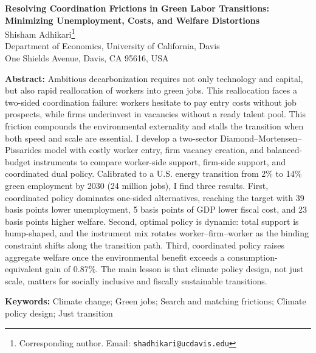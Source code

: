 \documentclass[12pt]{elsarticle}
\begin{document}
\thispagestyle{empty}

\begin{center}
    {\textbf{Resolving Coordination Frictions in Green Labor Transitions:}}\\[0.4em]
    { \textbf{Minimizing Unemployment, Costs, and Welfare Distortions}}\\[2em]

    {\normalsize
    Shisham Adhikari\footnote{Corresponding author. Email: \texttt{shadhikari@ucdavis.edu}}\\[0.5em]
    Department of Economics, University of California, Davis\\
    One Shields Avenue, Davis, CA 95616, USA}
\end{center}

\vspace{1.5em}

\noindent\textbf{Abstract:}
Ambitious decarbonization requires not only technology and capital, but also rapid reallocation of workers into green jobs. This reallocation faces a two-sided coordination failure: workers hesitate to pay entry costs without job prospects, while firms underinvest in vacancies without a ready talent pool. This friction compounds the environmental externality and stalls the transition when both speed and scale are essential. I develop a two-sector Diamond–Mortensen–Pissarides model with costly worker entry, firm vacancy creation, and balanced-budget instruments to compare worker-side support, firm-side support, and coordinated dual policy. Calibrated to a U.S. energy transition from 2\% to 14\% green employment by 2030 (24 million jobs), I find three results. First, coordinated policy dominates one-sided alternatives, reaching the target with 39 basis points lower unemployment, 5 basis points of GDP lower fiscal cost, and 23 basis points higher welfare. Second, optimal policy is dynamic: total support is hump-shaped, and the instrument mix rotates worker–firm–worker as the binding constraint shifts along the transition path. Third, coordinated policy raises aggregate welfare once the environmental benefit exceeds a consumption-equivalent gain of 0.87\%. The main lesson is that climate policy design, not just scale, matters for socially inclusive and fiscally sustainable transitions.

\vspace{1em}

\noindent\textbf{Keywords:}
Climate change; Green jobs; Search and matching frictions; Climate policy design; Just transition
\end{document}
